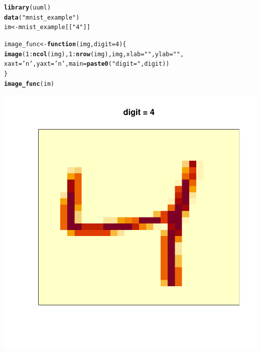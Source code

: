 \documentclass[10pt, a4paper, english]{article}\usepackage[]{graphicx}\usepackage[dvipsnames]{xcolor}
\makeatletter
\def\maxwidth{ %
  \ifdim\Gin@nat@width>\linewidth
    \linewidth
  \else
    \Gin@nat@width
  \fi
}
\newcommand{\hlnum}[1]{\textcolor[rgb]{0.686,0.059,0.569}{#1}}%
\newcommand{\hlstr}[1]{\textcolor[rgb]{0.192,0.494,0.8}{#1}}%
\newcommand{\hlopt}[1]{\textcolor[rgb]{0,0,0}{#1}}%
\newcommand{\hlstd}[1]{\textcolor[rgb]{0.345,0.345,0.345}{#1}}%
\newcommand{\hlkwa}[1]{\textcolor[rgb]{0.161,0.373,0.58}{\textbf{#1}}}%
\newcommand{\hlkwb}[1]{\textcolor[rgb]{0.69,0.353,0.396}{#1}}%
\newcommand{\hlkwc}[1]{\textcolor[rgb]{0.333,0.667,0.333}{#1}}%
\newcommand{\hlkwd}[1]{\textcolor[rgb]{0.737,0.353,0.396}{\textbf{#1}}}%
\newenvironment{kframe}{%
 \def\at@end@of@kframe{}%
 \ifinner\ifhmode%
  \def\at@end@of@kframe{\end{minipage}}%
  \begin{minipage}{\columnwidth}%
 \fi\fi%
 \def\FrameCommand##1{\hskip\@totalleftmargin \hskip-\fboxsep
 \colorbox{shadecolor}{##1}\hskip-\fboxsep
     \hskip-\linewidth \hskip-\@totalleftmargin \hskip\columnwidth}%
 \MakeFramed {\advance\hsize-\width
   \@totalleftmargin\z@ \linewidth\hsize
   \@setminipage}}%
 {\par\unskip\endMakeFramed%
 \at@end@of@kframe}
\newenvironment{knitrout}{}{} %
\makeatother
\begin{document}
\begin{knitrout}
\color{fgcolor}\begin{kframe}
\begin{alltt}
\hlkwd{library}\hlstd{(uuml)}
\hlkwd{data}\hlstd{(}\hlstr{"mnist_example"}\hlstd{)}
\hlstd{im} \hlkwb{<-} \hlstd{mnist_example[[}\hlstr{"4"}\hlstd{]]}

\hlstd{image_func} \hlkwb{<-} \hlkwa{function}\hlstd{(}\hlkwc{img}\hlstd{,} \hlkwc{digit}\hlstd{=}\hlnum{4}\hlstd{)\{}
  \hlkwd{image}\hlstd{(}\hlnum{1}\hlopt{:} \hlkwd{ncol}\hlstd{(img),} \hlnum{1}\hlopt{:} \hlkwd{nrow}\hlstd{(img), img,} \hlkwc{xlab} \hlstd{=} \hlstr{""}\hlstd{,} \hlkwc{ylab} \hlstd{=} \hlstr{""}\hlstd{,}
      \hlkwc{xaxt}\hlstd{=}\hlstr{'n'} \hlstd{,} \hlkwc{yaxt}\hlstd{=}\hlstr{'n'} \hlstd{,} \hlkwc{main}\hlstd{=}\hlkwd{paste0}\hlstd{(}\hlstr{"digit = "}\hlstd{, digit))}
\hlstd{\}}
\hlkwd{image_func}\hlstd{(im)}
\end{alltt}
\end{kframe}
\includegraphics[width=\maxwidth]{figure/unnamed-chunk-33-1} 
\end{knitrout}
\end{document}
